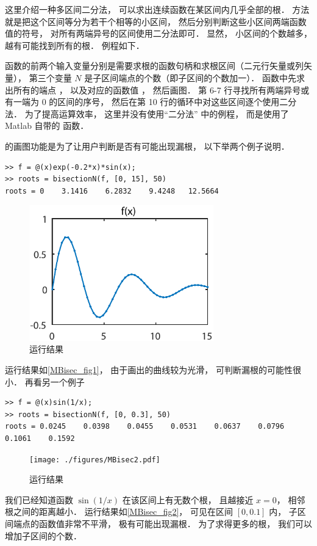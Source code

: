 

这里介绍一种多区间二分法， 可以求出连续函数在某区间内几乎全部的根． 方法就是把这个区间等分为若干个相等的小区间， 然后分别判断这些小区间两端函数值的符号， 对所有两端异号的区间使用二分法即可． 显然， 小区间的个数越多， 越有可能找到所有的根． 例程如下．


函数的前两个输入变量分别是需要求根的函数句柄和求根区间（二元行矢量或列矢量）， 第三个变量 $N$ 是子区间端点的个数（即子区间的个数加一）． 函数中先求出所有的端点 ， 以及对应的函数值 ， 然后画图． 第 6-7 行寻找所有两端异号或有一端为 0 的区间的序号， 然后在第 10 行的循环中对这些区间逐个使用二分法． 为了提高运算效率， 这里并没有使用“二分法” 中的例程， 而是使用了 Matlab 自带的  函数．

 的画图功能是为了让用户判断是否有可能出现漏根， 以下举两个例子说明．
\begin{lstlisting}[language=MatlabCom]
>> f = @(x)exp(-0.2*x)*sin(x);
>> roots = bisectionN(f, [0, 15], 50)
roots = 0    3.1416    6.2832    9.4248   12.5664
\end{lstlisting}
\begin{figure}[ht]
\centering
\includegraphics[width=8cm]{./figures/MBisec1.pdf}
\caption{运行结果} \label{MBisec_fig1}
\end{figure}
运行结果如\autoref{MBisec_fig1}， 由于画出的曲线较为光滑， 可判断漏根的可能性很小． 再看另一个例子
\begin{lstlisting}[language=MatlabCom]
>> f = @(x)sin(1/x);
>> roots = bisectionN(f, [0, 0.3], 50)
roots = 0.0245    0.0398    0.0455    0.0531    0.0637    0.0796    0.1061    0.1592
\end{lstlisting}
\begin{figure}[ht]
\centering
\texttt{[image: ./figures/MBisec2.pdf]}
\caption{运行结果} \label{MBisec_fig2}
\end{figure}
我们已经知道函数 $\sin(1/x)$ 在该区间上有无数个根， 且越接近 $x = 0$， 相邻根之间的距离越小． 运行结果如\autoref{MBisec_fig2}，  可见在区间 $[0, 0.1]$ 内， 子区间端点的函数值非常不平滑， 极有可能出现漏根． 为了求得更多的根， 我们可以增加子区间的个数．
